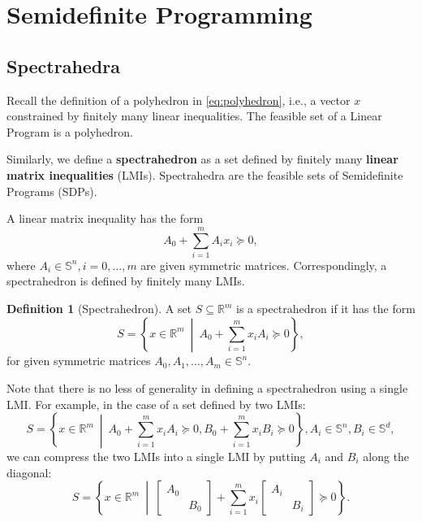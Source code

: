 \documentclass[
]{book}
\theoremstyle{definition}
\newtheorem{definition}{Definition}[chapter]
\theoremstyle{definition}
\theoremstyle{definition}
\theoremstyle{definition}
\theoremstyle{remark}
\begin{document}
\hypertarget{semidefinite-programming}{%
\section{Semidefinite Programming}\label{semidefinite-programming}}

\hypertarget{spectrahedra}{%
\subsection{Spectrahedra}\label{spectrahedra}}

Recall the definition of a polyhedron in \eqref{eq:polyhedron}, i.e., a vector \(x\) constrained by finitely many linear inequalities. The feasible set of a Linear Program is a polyhedron.

Similarly, we define a \textbf{spectrahedron} as a set defined by finitely many \textbf{linear matrix inequalities} (LMIs). Spectrahedra are the feasible sets of Semidefinite Programs (SDPs).

A linear matrix inequality has the form
\[
A_0 + \sum_{i=1}^m A_i x_i \succeq 0,
\]
where \(A_i \in \mathbb{S}^{n},i=0,\dots,m\) are given symmetric matrices. Correspondingly, a spectrahedron is defined by finitely many LMIs.

\begin{definition}[Spectrahedron]
\protect\hypertarget{def:Spectrahedron}{}\label{def:Spectrahedron}A set \(S \subseteq \mathbb{R}^{m}\) is a spectrahedron if it has the form
\[
S =  \left\{ x \in \mathbb{R}^{m} \ \middle\vert\ A_0 + \sum_{i=1}^m x_i A_i \succeq 0 \right\} ,
\]
for given symmetric matrices \(A_0,A_1,\dots,A_m \in \mathbb{S}^{n}\).
\end{definition}

Note that there is no less of generality in defining a spectrahedron using a single LMI. For example, in the case of a set defined by two LMIs:
\[
S =  \left\{ x \in \mathbb{R}^{m} \ \middle\vert\ A_0 + \sum_{i=1}^m x_i A_i \succeq 0, B_0 + \sum_{i=1}^m x_i B_i \succeq 0  \right\} , A_i \in \mathbb{S}^{n}, B_i \in \mathbb{S}^{d},
\]
we can compress the two LMIs into a single LMI by putting \(A_i\) and \(B_i\) along the diagonal:
\[
S =  \left\{ x \in \mathbb{R}^{m} \ \middle\vert\ \begin{bmatrix} A_0 & \\ & B_0 \end{bmatrix} + \sum_{i=1}^m x_i \begin{bmatrix} A_i & \\ & B_i \end{bmatrix} \succeq 0  \right\} .
\]
\end{document}
